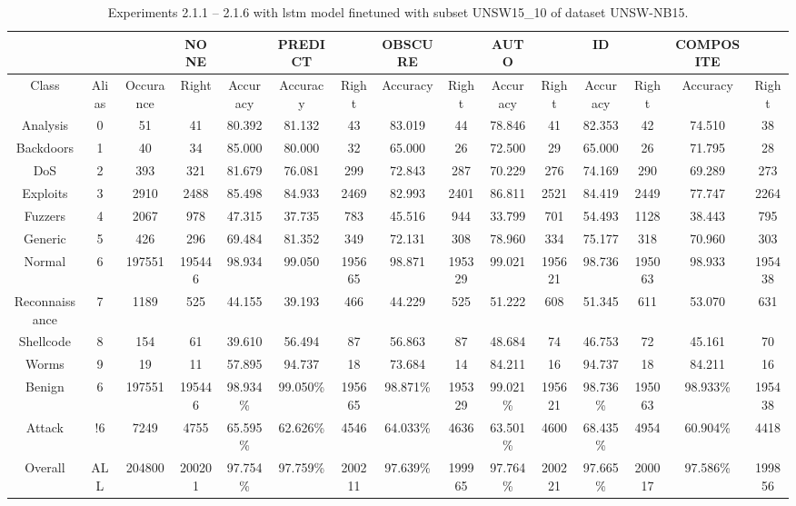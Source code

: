 \begin{table}[htb]
    \centering
    \caption{Experiments 2.1.1 – 2.1.6 with \gls{lstm} model finetuned with subset UNSW15\_10 of dataset UNSW-NB15.}
    \label{table:results:lstm:flows15_subset}
    \begin{tabular}{@{}ccccccccccccccc@{}}
        \toprule
         &  &  & NONE &  & PREDICT &  & OBSCURE &  & AUTO &  & ID &  & COMPOSITE &  \\
        \midrule
        Class &  Alias &  Occurance &  Right &  Accuracy &  Accuracy &  Right &  Accuracy &  Right &  Accuracy &  Right &  Accuracy &  Right &  Accuracy &  Right \\
        Analysis &  0 &  51 &  41 &  80.392 &  81.132 &  43 &  83.019 &  44 &  78.846 &  41 &  82.353 &  42 &  74.510 &  38 \\
        Backdoors &  1 &  40 &  34 &  85.000 &  80.000 &  32 &  65.000 &  26 &  72.500 &  29 &  65.000 &  26 &  71.795 &  28 \\
        DoS &  2 &  393 &  321 &  81.679 &  76.081 &  299 &  72.843 &  287 &  70.229 &  276 &  74.169 &  290 &  69.289 &  273 \\
        Exploits &  3 &  2910 &  2488 &  85.498 &  84.933 &  2469 &  82.993 &  2401 &  86.811 &  2521 &  84.419 &  2449 &  77.747 &  2264 \\
        Fuzzers &  4 &  2067 &  978 &  47.315 &  37.735 &  783 &  45.516 &  944 &  33.799 &  701 &  54.493 &  1128 &  38.443 &  795 \\
        Generic &  5 &  426 &  296 &  69.484 &  81.352 &  349 &  72.131 &  308 &  78.960 &  334 &  75.177 &  318 &  70.960 &  303 \\
        Normal &  6 &  197551 &  195446 &  98.934 &  99.050 &  195665 &  98.871 &  195329 &  99.021 &  195621 &  98.736 &  195063 &  98.933 &  195438 \\
        Reconnaissance &  7 &  1189 &  525 &  44.155 &  39.193 &  466 &  44.229 &  525 &  51.222 &  608 &  51.345 &  611 &  53.070 &  631 \\
        Shellcode &  8 &  154 &  61 &  39.610 &  56.494 &  87 &  56.863 &  87 &  48.684 &  74 &  46.753 &  72 &  45.161 &  70 \\
        Worms &  9 &  19 &  11 &  57.895 &  94.737 &  18 &  73.684 &  14 &  84.211 &  16 &  94.737 &  18 &  84.211 &  16 \\
        Benign &  6 &  197551 &  195446 &  98.934\% &  99.050\% &  195665 &  98.871\% &  195329 &  99.021\% &  195621 &  98.736\% &  195063 &  98.933\% &  195438 \\
        Attack &  !6 &  7249 &  4755 &  65.595\% &  62.626\% &  4546 &  64.033\% &  4636 &  63.501\% &  4600 &  68.435\% &  4954 &  60.904\% &  4418 \\
        Overall &  ALL &  204800 &  200201 &  97.754\% &  97.759\% &  200211 &  97.639\% &  199965 &  97.764\% &  200221 &  97.665\% &  200017 &  97.586\% &  199856 \\
        \bottomrule
    \end{tabular}
\end{table}